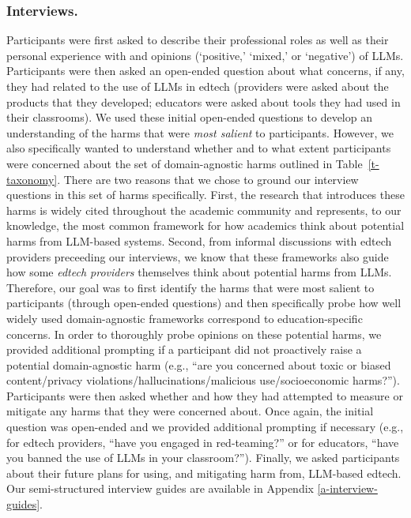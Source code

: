 \subsubsection*{Interviews.} 
Participants were first asked to describe their professional roles as well as their personal experience with and opinions (`positive,' `mixed,' or `negative') of LLMs. Participants were then asked an open-ended question about what concerns, if any, they had related to the use of LLMs in edtech (providers were asked about the products that they developed; educators were asked about tools they had used in their classrooms). We used these initial open-ended questions to develop an understanding of the harms that were \textit{most salient} to participants. However, we also specifically wanted to understand whether and to what extent participants were concerned about the set of domain-agnostic harms outlined in Table~\ref{t-taxonomy}. There are two reasons that we chose to ground our interview questions in this set of harms specifically. First, the research that introduces these harms \cite{bender_dangers_2021, weidinger_taxonomy_2022} is widely cited throughout the academic community and represents, to our knowledge, the most common framework for how academics think about potential harms from LLM-based systems. Second, from informal discussions with edtech providers preceeding our interviews, we know that these frameworks also guide how some \textit{edtech providers} themselves think about potential harms from LLMs. Therefore, our goal was to first identify the harms that were most salient to participants (through open-ended questions) and then specifically probe how well widely used domain-agnostic frameworks correspond to education-specific concerns. In order to thoroughly probe opinions on these potential harms, we provided additional prompting if a participant did not proactively raise a potential domain-agnostic harm (e.g., ``are you concerned about toxic or biased content/privacy violations/hallucinations/malicious use/socioeconomic harms?''). Participants were then asked whether and how they had attempted to measure or mitigate any harms that they were concerned about. Once again, the initial question was open-ended and we provided additional prompting if necessary (e.g., for edtech providers, ``have you engaged in red-teaming?'' or for educators, ``have you banned the use of LLMs in your classroom?''). Finally, we asked participants about their future plans for using, and mitigating harm from, LLM-based edtech. Our semi-structured interview guides are available in Appendix \ref{a-interview-guides}.


